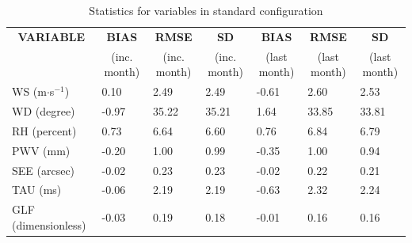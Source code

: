 \documentclass[a4paper,english]{article}
\begin{document}
\clearpage
\begin{table}[]
\begin{center}
\begin{tabular}{|l|l|l|l|l|l|l|}
\hline
\multicolumn{1}{|c|}{\cellcolor[HTML]{C0C0C0}\textbf{VARIABLE}} & \multicolumn{1}{c|}{\cellcolor[HTML]{C0C0C0}\textbf{BIAS}} & \multicolumn{1}{c|}{\cellcolor[HTML]{C0C0C0}\textbf{RMSE}} & \multicolumn{1}{c|}{\cellcolor[HTML]{C0C0C0}\textbf{SD}} & \multicolumn{1}{c|}{\cellcolor[HTML]{C0C0C0}\textbf{BIAS}} & \multicolumn{1}{c|}{\cellcolor[HTML]{C0C0C0}\textbf{RMSE}} & \multicolumn{1}{c|}{\cellcolor[HTML]{C0C0C0}\textbf{SD}}\\
\multicolumn{1}{|c|}{\cellcolor[HTML]{C0C0C0}} & \multicolumn{1}{c|}{\cellcolor[HTML]{C0C0C0}(inc. month)} & \multicolumn{1}{c|}{\cellcolor[HTML]{C0C0C0}(inc. month)} & \multicolumn{1}{c|}{\cellcolor[HTML]{C0C0C0}(inc. month)} & \multicolumn{1}{c|}{\cellcolor[HTML]{C0C0C0}(last month)} & \multicolumn{1}{c|}{\cellcolor[HTML]{C0C0C0}(last month)} & \multicolumn{1}{c|}{\cellcolor[HTML]{C0C0C0}(last month)}\\\hline
\cellcolor[HTML]{C0C0C0}WS (m$\cdot$s$^{-1}$) &      0.10  &      2.49  &      2.49  &     -0.61     &      2.60     &      2.53\\
\cellcolor[HTML]{C0C0C0}WD (degree)           &     -0.97  &     35.22  &     35.21  &      1.64     &     33.85     &     33.81\\
\cellcolor[HTML]{C0C0C0}RH (percent)          &      0.73  &      6.64  &      6.60  &      0.76     &      6.84     &      6.79\\
\cellcolor[HTML]{C0C0C0}PWV (mm)              &     -0.20 &      1.00 &      0.99 &     -0.35    &      1.00    &      0.94\\
\cellcolor[HTML]{C0C0C0}SEE (arcsec)          &     -0.02 &      0.23 &      0.23 &     -0.02    &      0.22    &      0.21\\
\cellcolor[HTML]{C0C0C0}TAU (ms)              &     -0.06 &      2.19 &      2.19 &     -0.63    &      2.32    &      2.24\\
\cellcolor[HTML]{C0C0C0}GLF (dimensionless)   &     -0.03 &      0.19 &      0.18 &     -0.01    &      0.16    &      0.16\\
\hline
\end{tabular}
\caption{Statistics for variables in standard configuration}
\end{center}
\end{table}
\end{document}
